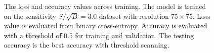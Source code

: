 \documentclass[12pt]{article}
\begin{document}
\begin{figure}[htpb]
{                }
                \caption{The loss and accuracy values across training. The model is trained on the sensitivity $S / \sqrt{B} = 3.0$ dataset with resolution $75\times 75$. Loss value is evaluated from binary cross-entropy. Accuracy is evaluated with a threshold of 0.5 for training and validation. The testing accuracy is the best accuracy with threshold scanning.}
                \label{fig:loss_acc_across_training_SB_3_res_75}
            \end{figure}

            \begin{figure}[htpb]
                \centering
                 \\
\end{figure}
\end{document}
